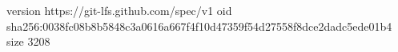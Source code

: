 version https://git-lfs.github.com/spec/v1
oid sha256:0038fc08b8b5848c3a0616a667f4f10d47359f54d27558f8dce2dadc5ede01b4
size 3208
